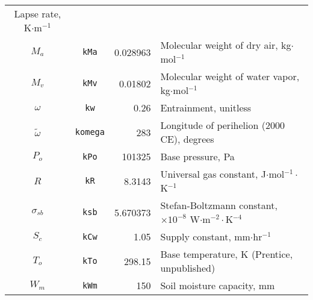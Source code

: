 \begin{longtable}{c c r p{6cm}}
        Lapse rate, K$\cdot$m$^{-1}$ 
        \parencite{cavcar00} \\
    $M_a$ & \texttt{kMa} & 0.028963 &
        Molecular weight of dry air, kg$\cdot$mol$^{-1}$ 
        \parencite{tsilingiris08} \\
    $M_v$ & \texttt{kMv} & 0.01802 &
        Molecular weight of water vapor, kg$\cdot$mol$^{-1}$
        \parencite{tsilingiris08} \\
	$\omega$ & \texttt{kw} & 0.26 & 
        Entrainment, unitless 
        \parencite{lhomme97,priestley72} \\    
    $\tilde{\omega}$ & \texttt{komega} & 283 & 
        Longitude of perihelion (2000 CE), degrees 
        \parencite{berger78} \\
    $P_o$ & \texttt{kPo} & 101325 &
        Base pressure, Pa 
        \parencite{cavcar00} \\
    $R$ & \texttt{kR} & 8.3143 &
        Universal gas constant, J$\cdot$mol$^{-1}\cdot$K$^{-1}$ 
        \parencite{allen73} \\
    $\sigma_{sb}$ & \texttt{ksb} & 5.670373 &
        Stefan-Boltzmann constant, $\times 10^{-8}$ 
        W$\cdot$m$^{-2}\cdot$K$^{-4}$ \\
    $S_c$ & \texttt{kCw} & 1.05 & 
        Supply constant, mm$\cdot$hr$^{-1}$  
        \parencite{federer82} \\
    $T_o$ & \texttt{kTo} & 298.15 &
        Base temperature, K 
        (Prentice, unpublished) \\
    $W_m$ & \texttt{kWm} & 150 &
        Soil moisture capacity, mm  
        \parencite{cramer88} \\
        \hline
\end{longtable}

